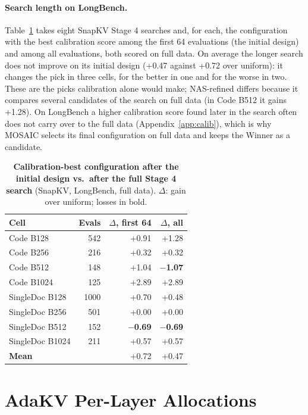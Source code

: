 \paragraph{Search length on LongBench.} Table~\ref{tab:app-search-curve} takes eight SnapKV Stage 4 searches and, for each, the configuration with the best calibration score among the first 64 evaluations (the initial design) and among all evaluations, both scored on full data. On average the longer search does not improve on its initial design (+0.47 against +0.72 over uniform): it changes the pick in three cells, for the better in one and for the worse in two. These are the picks calibration alone would make; NAS-refined differs because it compares several candidates of the search on full data (in Code B512 it gains +1.28). On LongBench a higher calibration score found later in the search often does not carry over to the full data (Appendix~\ref{app:calib}), which is why MOSAIC selects its final configuration on full data and keeps the Winner as a candidate.

\begin{table}[!htbp]
  \centering
  \footnotesize
  \setlength{\tabcolsep}{4pt}
  \begin{tabular}{@{}l r r r@{}}
    \toprule
    Cell & Evals & $\Delta$, first 64 & $\Delta$, all \\
    \midrule
    Code B128 & 542 & +0.91 & +1.28 \\
    Code B256 & 216 & +0.32 & +0.32 \\
    Code B512 & 148 & +1.04 & \textbf{$-$1.07} \\
    Code B1024 & 125 & +2.89 & +2.89 \\
    SingleDoc B128 & 1000 & +0.70 & +0.48 \\
    SingleDoc B256 & 501 & +0.00 & +0.00 \\
    SingleDoc B512 & 152 & \textbf{$-$0.69} & \textbf{$-$0.69} \\
    SingleDoc B1024 & 211 & +0.57 & +0.57 \\
    \textbf{Mean} &  & +0.72 & +0.47 \\
    \bottomrule
  \end{tabular}
  \caption{\textbf{Calibration-best configuration after the initial design vs.\ after the full Stage 4 search} (SnapKV, LongBench, full data). $\Delta$: gain over uniform; losses in bold.}
  \label{tab:app-search-curve}
\end{table}


\section{AdaKV Per-Layer Allocations}
\label{app:adakv-shapes}

